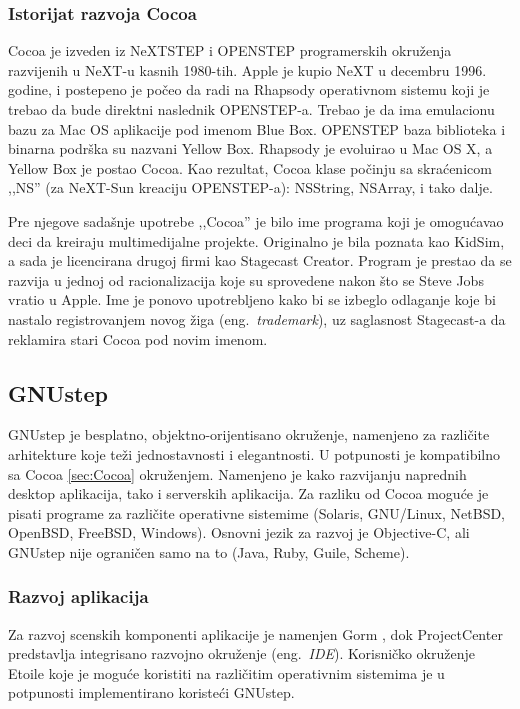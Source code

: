 \documentclass[a4paper]{article}
\begin{document}
{\subsubsection{Istorijat razvoja Cocoa}
Cocoa je izveden iz NeXTSTEP i OPENSTEP programerskih okruženja razvijenih u NeXT-u kasnih 1980-tih. Apple je kupio NeXT u decembru 1996. godine, i postepeno je počeo da radi na Rhapsody operativnom sistemu koji je trebao da bude direktni naslednik OPENSTEP-a. Trebao je da ima emulacionu bazu za Mac OS aplikacije pod imenom Blue Box. OPENSTEP baza biblioteka i binarna podrška su nazvani Yellow Box. Rhapsody je evoluirao u Mac OS X, a Yellow Box je postao Cocoa. Kao rezultat, Cocoa klase počinju sa skraćenicom ,,NS'' (za NeXT-Sun kreaciju OPENSTEP-a): NSString, NSArray, i tako dalje.


Pre njegove sadašnje upotrebe ,,Cocoa'' je bilo ime programa koji je omogućavao deci da kreiraju multimedijalne projekte. Originalno je bila poznata kao KidSim, a sada je licencirana drugoj firmi kao Stagecast Creator. Program je prestao da se razvija u jednoj od racionalizacija koje su sprovedene nakon što se Steve Jobs vratio u Apple. Ime je ponovo upotrebljeno kako bi se izbeglo odlaganje koje bi nastalo registrovanjem novog žiga (eng.~{\em trademark}), uz saglasnost Stagecast-a da reklamira stari Cocoa pod novim imenom.


\subsection{GNUstep}
\label{GNUstep}
GNUstep \cite{objectivecandgnustep} je besplatno, objektno-orijentisano okruženje, namenjeno za različite arhitekture koje teži jednostavnosti i elegantnosti. U potpunosti je kompatibilno sa Cocoa \ref{sec:Cocoa} okruženjem. Namenjeno je kako razvijanju naprednih desktop aplikacija, tako i serverskih aplikacija. Za razliku od Cocoa moguće je pisati programe za različite operativne sistemime (Solaris, GNU/Linux, NetBSD, OpenBSD, FreeBSD, Windows). 
Osnovni jezik za razvoj je Objective-C, ali GNUstep nije ograničen samo na to (Java, Ruby, Guile, Scheme).

\subsubsection{Razvoj aplikacija}
Za razvoj scenskih komponenti aplikacije je namenjen Gorm \cite{gorm}, dok ProjectCenter \cite{projectcenter} predstavlja integrisano razvojno okruženje (eng.~{\em IDE}).   
Korisničko okruženje Etoile \cite{etoile} koje je moguće koristiti na različitim operativnim sistemima je u potpunosti implementirano koristeći GNUstep. 
  
}
\end{document}
